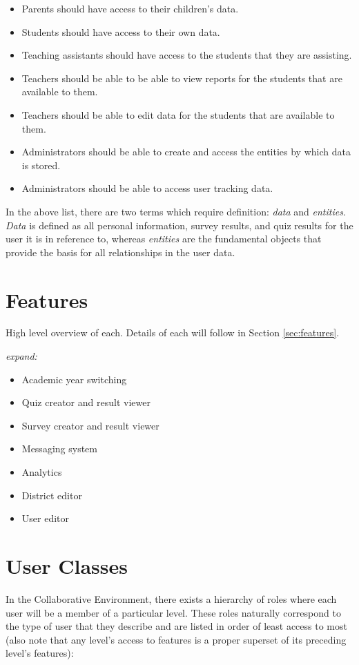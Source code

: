 \begin{itemize}
\item Parents should have access to their children's data.
\item Students should have access to their own data.
\item Teaching assistants should have access to the students that they are assisting.
\item Teachers should be able to be able to view reports for the students that are available to them.
\item Teachers should be able to edit data for the students that are available to them.
\item Administrators should be able to create and access the entities by which data is stored.
\item Administrators should be able to access user tracking data.
\end{itemize}

In the above list, there are two terms which require definition: \emph{data} and \emph{entities}. \emph{Data} is defined as all personal information, survey results, and quiz results for the user it is in reference to, whereas \emph{entities} are the fundamental objects that provide the basis for all relationships in the user data.


\section{Features}
\label{sec:overview-features}
High level overview of each. Details of each will follow in Section \ref{sec:features}.

\textit{expand:}

\begin{itemize}
	\item Academic year switching
	\item Quiz creator and result viewer
	\item Survey creator and result viewer
	\item Messaging system
	\item Analytics
	\item District editor
	\item User editor
\end{itemize}

\section{User Classes}

In the Collaborative Environment, there exists a hierarchy of roles where each user will be a member of a particular level. These roles naturally correspond to the type of user that they describe and are listed in order of least access to most (also note that any level's access to features is a proper superset of its preceding level's features):

